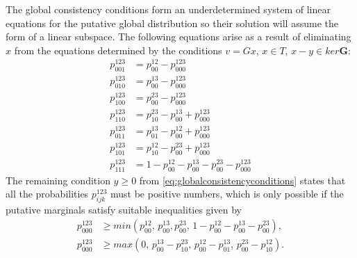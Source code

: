 The global consistency conditions form an underdetermined system of linear equations for the putative global distribution so their solution will assume the form of a linear subspace.  The following equations arise as a result of eliminating $x$ from the equations determined by the conditions $v=Gx$, $x \in T$, $x-y \in ker \mathbf{G}$:
\begin{equation}
\begin{aligned}\label{eq:globalpositivityeqs}
p^{123}_{001} &= p^{12}_{00} - p^{123}_{000} \\
p^{123}_{010} &= p^{13}_{00} - p^{123}_{000} \\
p^{123}_{100} &= p^{23}_{00} - p^{123}_{000} \\
p^{123}_{110} &= p^{23}_{10} - p^{13}_{00} + p^{123}_{000} \\
p^{123}_{011} &= p^{13}_{01} - p^{12}_{00} + p^{123}_{000} \\
p^{123}_{101} &= p^{12}_{10} - p^{23}_{00} + p^{123}_{000} \\
p^{123}_{111} &= 1 - p^{12}_{00} - p^{13}_{00} - p^{23}_{00} - p^{123}_{000}
\end{aligned}
\end{equation}
The remaining condition $y \geq 0$ from \ref{eq:globalconsistencyconditions} states that all the probabilities $p^{123}_{ijk}$ must be positive numbers, which is only possible if the putative marginals satisfy suitable inequalities given by
\begin{equation}
\begin{aligned}\label{eq:globalpositivityineqs}
p^{123}_{000} &\geq min(p^{12}_{00},\, p^{13}_{00},p^{23}_{00},\, 1 - p^{12}_{00} - p^{13}_{00} - p^{23}_{00}),\\
 p^{123}_{000} &\geq max(0,\, p^{13}_{00}-p^{23}_{10},\, p^{12}_{00}-p^{13}_{01},\, p^{23}_{00}-p^{12}_{10}).
\end{aligned}
\end{equation}
